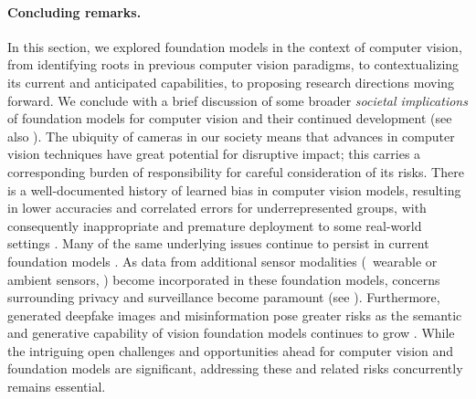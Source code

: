 \paragraph{Concluding remarks.} In this section, we explored foundation models in the context of computer vision, from identifying roots in previous computer vision paradigms, to contextualizing its current and anticipated capabilities, to proposing research directions moving forward. 
We conclude with a brief discussion of some broader \textit{societal implications} of foundation models for computer vision and their continued development (see also ).
The ubiquity of cameras in our society means that advances in computer vision techniques have great potential for disruptive impact; this carries a corresponding burden of responsibility for careful consideration of its risks. 
There is a well-documented history of learned bias in computer vision models, resulting in lower accuracies and correlated errors for underrepresented groups, with consequently inappropriate and premature deployment to some real-world settings \citep[\eg][]{buolamwini2018gender}. 
Many of the same underlying issues continue to persist in current foundation models \cite{agarwal2021evaluating}. 
As data from additional sensor modalities (\eg~wearable or ambient sensors, ) become incorporated in these foundation models, concerns surrounding privacy and surveillance become paramount (see ).
Furthermore, generated deepfake images and misinformation pose greater risks as the semantic and generative capability of vision foundation models continues to grow \citep[][]{dolhansky2020deepfake,ramesh2021zeroshot}.
While the intriguing open challenges and opportunities ahead for computer vision and foundation models are significant, addressing these and related risks concurrently remains essential.